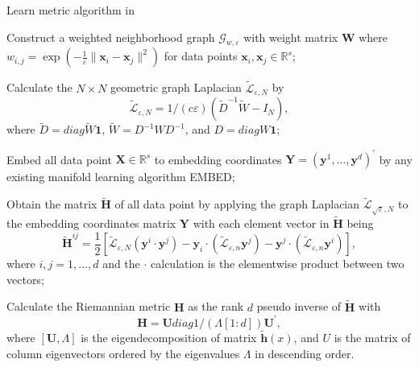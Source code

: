 \documentclass[11pt,a4paper,]{article}
\begin{document}
\begin{algorithm}[!htb]
  \caption{Learn metric algorithm in \cite{Perrault-Joncas2013-pq} }
  \label{alg:learnmetric}
  \DontPrintSemicolon
  \SetAlgoLined
  \BlankLine
  \begin{algorithmic}[1]

  \STATE Construct a weighted neighborhood graph $\mathcal{G}_{w,\varepsilon}$ with weight matrix $\pmb{W}$ where $w_{i,j}=\exp(-\frac{1}{\varepsilon}\|\pmb{x}_i-\pmb{x}_j\|^2)$ for data points $\pmb{x}_i,\pmb{x}_j \in \mathbb{R}^s$;

  \STATE Calculate the $N\times N$ geometric graph Laplacian $\widetilde{\mathcal{L}}_{\varepsilon,N}$ by
  $$
  \widetilde{\mathcal{L}}_{\varepsilon,N} = 1/(c\varepsilon)(\widetilde{D}^{-1} \widetilde{W} - I_N),
  $$
  where $\widetilde{D}=diag{\widetilde{W}\pmb{1}}$, $\widetilde{W} = D^{-1}WD^{-1}$, and $D = diag{W\pmb{1}}$;

  \STATE Embed all data point $\pmb{X}\in \mathbb{R}^s$ to embedding coordinates $\pmb{Y}=(\pmb{y}^1,\dots,\pmb{y}^d)^\prime$ by any existing manifold learning algorithm EMBED;

  \STATE Obtain the matrix $\pmb{\tilde{H}}$ of all data point by applying the graph Laplacian $\widetilde{\mathcal{L}}_{\sqrt{\varepsilon},N}$ to the embedding coordinates matrix $\pmb{Y}$ with each element vector in $\pmb{\tilde{H}}$ being
  $$
    \pmb{\tilde{H}}^{i j} = \frac{1}{2} \left[\tilde{\mathcal{L}}_{\varepsilon, N}\left(\pmb{y}^i \cdot \pmb{y}^j\right) - \pmb{y}_i \cdot\left(\tilde{\mathcal{L}}_{\varepsilon, n} \pmb{y}^j\right) - \pmb{y}^j \cdot\left(\tilde{\mathcal{L}}_{\varepsilon, n} \pmb{y}^i\right)\right],
  $$
  where $i,j=1,\dots,d$ and the $\cdot$ calculation is the elementwise product between two vectors; 

  \STATE Calculate the Riemannian metric $\pmb{H}$ as the rank $d$ pseudo inverse of $\tilde{\pmb{H}}$ with 
  $$
    \pmb{H} = \pmb{U} diag{1/(\Lambda[1:d])} \pmb{U}^\prime,
  $$
  where $[\pmb{U}, \Lambda]$ is the eigendecomposition of matrix $\pmb{\tilde{h}}(x)$, and $U$ is the matrix of column eigenvectors ordered by the eigenvalues $\Lambda$ in descending order.

  \end{algorithmic}
\end{algorithm}
\end{document}
